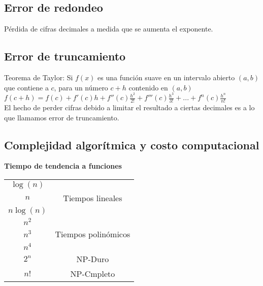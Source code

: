 \subsection{Error de redondeo} 
P\'erdida de cifras decimales a medida que se aumenta el exponente.

\subsection{Error de truncamiento}
Teorema de Taylor: Si $f(x)$ es una funci\'on suave en un intervalo abierto $(a,b)$ que contiene a $c$, para un n\'umero $c+h$ contenido en $(a,b)$ \\
$f(c+h)=f(c)+f'(c)h+f''(c)\frac{h^2}{2!}+f'''(c)\frac{h^3}{3!}+...+f^n(c)\frac{h^n}{n!}$ \\
El hecho de perder cifras debido a limitar el resultado a ciertas decimales es a lo que llamamos error de truncamiento.\\

\subsection{Complejidad algor\'itmica y costo computacional}

\begin{center}
\textbf{Tiempo de tendencia a funciones}\\
\begin{tabular}{| c | c |}
\hline
$\log(n)$ & \\
$n$ & Tiempos lineales \\ 
$n\log(n)$ & \\
\hline
$n^2$ & \\
$n^3$ & Tiempos polin\'omicos \\ 
$n^4$ & \\
\hline
$2^n$ & NP-Duro \\
$n!$ & NP-Cmpleto\\
\hline
\end{tabular}
\end{center}
